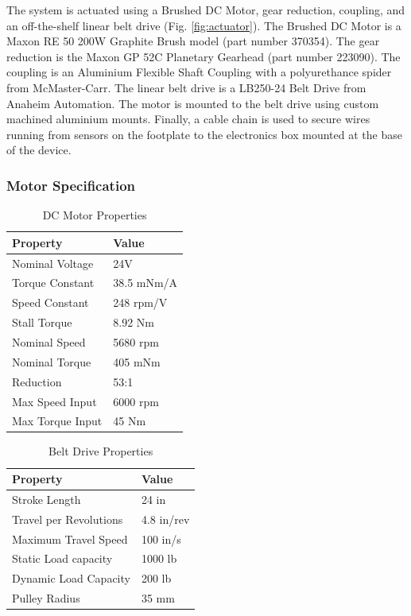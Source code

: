 \documentclass[12pt]{report}
\begin{document}
		
	The system is actuated using a Brushed DC Motor, gear reduction, coupling, and an off-the-shelf linear belt drive (Fig. \ref{fig:actuator}). The Brushed DC Motor is a Maxon RE 50 200W Graphite Brush model (part number 370354). The gear reduction is the Maxon GP 52C Planetary Gearhead (part number 223090). The coupling is an Aluminium Flexible Shaft Coupling with a polyurethance spider from McMaster-Carr. The linear belt drive is a LB250-24 Belt Drive from Anaheim Automation. The motor is mounted to the belt drive using custom machined aluminium mounts. Finally, a cable chain is used to secure wires running from sensors on the footplate to the electronics box mounted at the base of the device. 
	
	

	\subsubsection{Motor Specification}
	
	\begin{table}[h]
	\centering
	\caption{DC Motor Properties}	
	\begin{tabular}{|l|l|}
		\hline
		\textbf{Property} & \textbf{Value}  \\ \hline
 		Nominal Voltage & 24V  \\ \hline
 		Torque Constant & 38.5 mNm/A \\ \hline
 		Speed Constant & 248 rpm/V  \\ \hline
 		Stall Torque & 8.92 Nm \\ \hline
 		Nominal Speed & 5680 rpm \\ \hline
 		Nominal Torque & 405 mNm \\ \hline
 		Reduction & 53:1  \\ \hline
 		Max Speed Input & 6000 rpm  \\ \hline
 		Max Torque Input & 45 Nm  \\ \hline
		\end{tabular}
	\label{tab:motor}
	\end{table}
	
	
	\begin{table}[h]
	\centering
	\caption{Belt Drive Properties}	
	\begin{tabular}{|l|l|}
		\hline
		\textbf{Property} & \textbf{Value}  \\ \hline
		Stroke Length & 24 in  \\ \hline
 		Travel per Revolutions & 4.8 in/rev  \\ \hline
 		Maximum Travel Speed & 100 in/s  \\ \hline
 		Static Load capacity & 1000 lb  \\ \hline
 		Dynamic Load Capacity & 200 lb  \\ \hline
 		Pulley Radius & 35 mm  \\ \hline
		\end{tabular}
	\label{tab:belt}
	\end{table}
	
\end{document}
